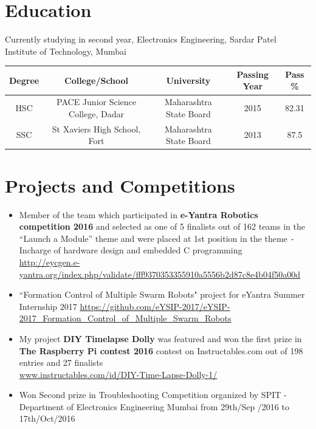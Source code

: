 \documentclass{article}
\begin{document}
	\section*{Education}
	
	Currently studying in second year, Electronics Engineering, Sardar Patel Institute of Technology, Mumbai
	\newline
	\begin{tabular}{|c|c|c|c|c|}
		\hline
		Degree & College/School & University & Passing Year & Pass \% \\
		\hline
		HSC & PACE Junior Science College, Dadar & Maharashtra State Board & 2015 & 82.31\\
		\hline
		SSC & St Xaviers High School, Fort & Maharashtra State Board  & 2013 & 87.5\\
		\hline
	\end{tabular}
	
	\section*{Projects and Competitions}
	\begin{itemize}%
		
		\item Member of the team which participated in \textbf{e-Yantra Robotics competition 2016} and selected as one of 5 finalists out of 162 teams in the “Launch a Module” theme and were placed at 1st
		position in the theme \verb|-| Incharge of hardware design and embedded C programming\\
		\url{http://eycgen.e-yantra.org/index.php/validate/fff9370353355910a5556b2d87c8e4b04f50a00d}		
		
		\item``Formation Control of Multiple Swarm Robots" project for eYantra Summer Internship 2017
		\url{https://github.com/eYSIP-2017/eYSIP-2017_Formation_Control_of_Multiple_Swarm_Robots}
			
		\item My project \textbf{DIY Timelapse Dolly} was featured and won the first prize in \textbf{The Raspberry Pi contest 2016} contest on Instructables.com out of 198 entries and 27 finalists\\
		\url{www.instructables.com/id/DIY-Time-Lapse-Dolly-1/}
		
		\item Won Second prize in Troubleshooting Competition organized by SPIT - Department of Electronics Engineering Mumbai from 29th/Sep /2016 to 17th/Oct/2016			
	\end{itemize}
	
\end{document}
